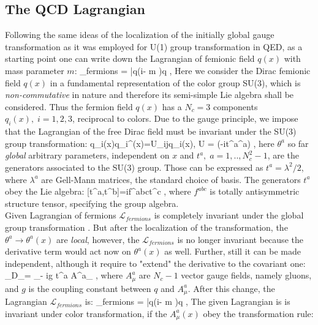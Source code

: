 	\subsection*{The QCD Lagrangian}
	Following the same ideas of the localization of the initially global gauge transformation as it was employed for U(1) group transformation in QED, as a starting point one can write down the Lagrangian of femionic field $q(x)$ with mass parameter $m$:
	\beqa
		_{fermions} = \bar{q}(i\dslash - m )q \;,
	\eeqa
	Here we consider the Dirac femionic field $q(x)$ in a fundamental representation of the color group SU(3), which is \textit{non-commutative} in nature and therefore  its semi-simple Lie algebra\cite{--} shall be considered. Thus the fermion field $q(x)$ has a $N_c=3$ components $q_i(x), \; i=1,2,3$, reciprocal to colors. Due to the gauge principle, we impose that the Lagrangian of the free Dirac field must be invariant under the SU(3) group transformation:
	\beqa
		\label{qcd_low:color_transform_ferm}
		q_i(x)\rightarrow  q_i^\prime(x)=U_{ij}q_i(x), \;\; U = (-it^a\theta^a) \;,
	\eeqa
	here $\theta^a$ so far \textit{global} arbitrary parameters, independent on $x$ and $t^a, \; a=1,..,N^2_c-1$, are the generators associated to the SU(3) group. Those can be expressed as $t^a=\lambda^2/2$, where $\lambda^a$ are Gell-Mann matrices, the standard choice of basis\cite{--}. The generators $t^a$ obey the Lie algebra:
	\beqa
		\label{qcd_low:commut_relation}
		[t^a,t^b]=if^{abc}t^c \;,
	\eeqa
	where $f^{abc}$ is totally antisymmetric structure tensor, specifying the group algebra. 
	\\
	Given Lagrangian of fermions $\mathcal{L}_{fermions}$ is completely invariant under the global group transformation \Eq{\ref{qcd_low:color_transform_ferm}}. But after the localization of the transformation, the $\theta^a\rightarrow \theta^a(x)$ are \textit{local}, however, the $\mathcal{L}_{fermions}$ is no longer invariant because the derivative term would act now on $\theta^a(x)$ as well. Further, still it can be made independent, although it require to "extend" the derivative to the covariant one:
	\beqa
		\partial_\mu \rightarrow D_\mu = \partial_\mu - ig t^a A^a_\mu \; ,
	\eeqa
	where $A^a_\mu$ are $N_c-1$ vector gauge fields, namely gluons, and $g$ is the coupling constant between $q$  and $A^a_\mu$. After this change, the Lagrangian $\mathcal{L}_{fermions}$ is:
	\beqa
		\label{qcd_low:L_fermions}
		_{fermions} = \bar{q}(i\Dslash - m )q \;,
	\eeqa
	The given Lagrangian is is invariant under \Eq{\ref{qcd_low:color_transform_ferm}} color transformation, if the $A^a_\mu(x)$ obey the transformation rule:
